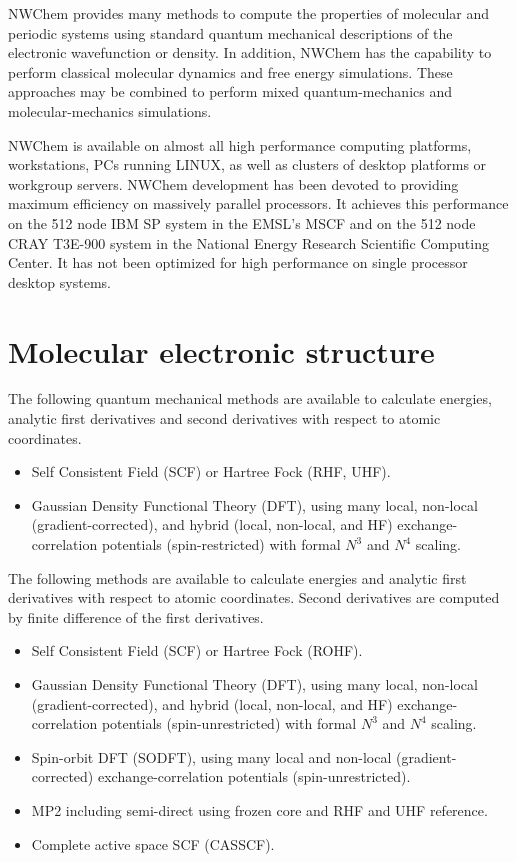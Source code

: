 \label{sec:functionality}

NWChem provides many methods to compute the properties of molecular and
periodic systems using standard quantum mechanical descriptions of the
electronic wavefunction or density.  In addition, NWChem has the
capability to perform classical molecular dynamics and free energy
simulations.  These approaches may be combined to perform mixed
quantum-mechanics and molecular-mechanics simulations. 

NWChem is available on almost all high performance computing platforms,
workstations, PCs running LINUX, as well as clusters of desktop platforms or
workgroup servers. NWChem development has been devoted to providing
maximum efficiency on massively parallel processors. It achieves this performance
on the 512 node IBM SP system in the EMSL's MSCF and on the 512 node CRAY
T3E-900 system in the National Energy Research Scientific Computing Center. It
has not been optimized for high performance on single processor desktop systems.

\section{Molecular electronic structure}

The following quantum mechanical methods are available to calculate
energies, analytic first derivatives and second derivatives with respect to atomic
coordinates.  

\begin{itemize}
\item Self Consistent Field (SCF) or Hartree Fock (RHF, UHF).
\item Gaussian Density Functional Theory (DFT), using many local,
  non-local (gradient-corrected), and hybrid (local, non-local, and HF)
exchange-correlation potentials 
(spin-restricted)
with formal $N^3$ and $N^4$ scaling.
\end{itemize}

The following methods are available to calculate energies and analytic
first derivatives with respect to atomic coordinates.  Second derivatives 
are computed by finite difference of the first derivatives.

\begin{itemize}
\item Self Consistent Field (SCF) or Hartree Fock (ROHF).  
\item Gaussian Density Functional Theory (DFT), using many local,
  non-local (gradient-corrected), and hybrid (local, non-local, and HF)
exchange-correlation potentials 
(spin-unrestricted)
with formal $N^3$ and $N^4$ scaling.
\item Spin-orbit DFT (SODFT), using many local and non-local (gradient-corrected)
exchange-correlation potentials (spin-unrestricted).
\item MP2 including semi-direct using frozen core and RHF and UHF reference.
\item Complete active space SCF (CASSCF).
\end{itemize}

